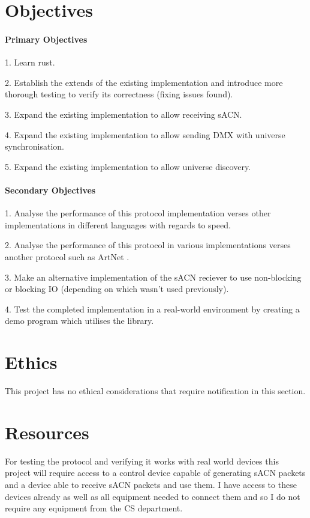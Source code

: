 \documentclass[12pt,a4paper,notitlepage]{report}
\begin{document}
\section*{Objectives}
\paragraph*{Primary Objectives}
\begin{list}{}{}
	\item 1. Learn rust.
	\item 2. Establish the extends of the existing implementation and introduce more thorough testing to verify its correctness (fixing issues found).
	\item 3. Expand the existing implementation to allow receiving sACN.
	\item 4. Expand the existing implementation to allow sending DMX with universe synchronisation.
	\item 5. Expand the existing implementation to allow universe discovery.
\end{list}

\paragraph*{Secondary Objectives}
\begin{list}{}{}
	\item 1. Analyse the performance of this protocol implementation verses other implementations in different languages with regards to speed.
	\item 2. Analyse the performance of this protocol in various implementations verses another protocol such as ArtNet \cite{ArtNet}.
	\item 3. Make an alternative implementation of the sACN reciever to use non-blocking or blocking IO (depending on which wasn't used previously).
	\item 4. Test the completed implementation in a real-world environment by creating a demo program which utilises the library. 
\end{list}

\section*{Ethics}
This project has no ethical considerations that require notification in this section.

\section*{Resources}
For testing the protocol and verifying it works with real world devices this project will require access to a control device capable of generating sACN packets and a device able to receive sACN packets and use them. I have access to these devices already as well as all equipment needed to connect them and so I do not require any equipment from the CS department. 
	
\end{document}
